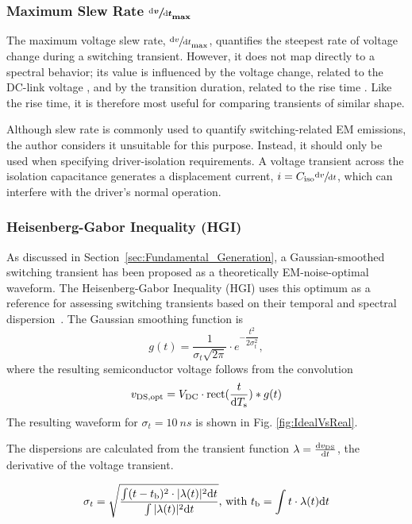 \subsubsection*{Maximum Slew Rate {$\boldmath\sfrac{\textnormal{d}v}{\textnormal{d}t}_\mathrm{max}$}}
The maximum voltage slew rate, $\sfrac{\textnormal{d}v}{\textnormal{d}t}_\mathrm{max}$, quantifies the steepest rate of voltage change during a switching transient. 
However, it does not map directly to a spectral behavior; its value is influenced by the voltage change, related to the DC-link voltage , and by the transition duration, related to the rise time . 
Like the rise time, it is therefore most useful for comparing transients of similar shape.

Although slew rate is commonly used to quantify switching-related EM emissions, the author considers it unsuitable for this purpose. 
Instead, it should only be used when specifying driver-isolation requirements. 
A voltage transient across the isolation capacitance generates a displacement current, $i = C_\mathrm{iso}\sfrac{\mathrm{d}v}{\mathrm{d}t}$, which can interfere with the driver's normal operation.

\subsubsection*{Heisenberg-Gabor Inequality (HGI)}
As discussed in Section~\ref{sec:Fundamental_Generation}, a Gaussian-smoothed switching transient has been proposed as a theoretically EM-noise-optimal waveform. 
The Heisenberg-Gabor Inequality (HGI) uses this optimum as a reference for assessing switching transients based on their temporal and spectral dispersion~\cite{patin_power_2015,martinez-padron_definition_2022}. 
The Gaussian smoothing function is
\begin{equation}
	g(t) = \frac{1}{\sigma_t \sqrt{2\pi}}\cdot e^{-\dfrac{t^2}{2\sigma_t^2}},
\end{equation}
where the resulting semiconductor voltage follows from the convolution
\begin{equation}
	{v}_{\mathrm{DS,opt}} = {V}_{\mathrm{DC}}\cdot\mathrm{rect}(\frac{t}{\mathrm{d}T_\mathrm{s}}) * g(t)
\end{equation}
The resulting waveform for $\sigma_t = \SI{10}{ns}$ is shown in Fig. \ref{fig:IdealVsReal}.

The dispersions are calculated from the transient function $\lambda = \frac{\text{d}{v}_{\mathrm{DS}}}{\text{d}t}$, the derivative of the voltage transient.

\begin{equation}
	\sigma_t = \sqrt{\frac{\int (t-{t}_{\mathrm{b}})^2 \cdot |\lambda(t)|^2 \text{d}t}{\int |\lambda(t)|^2 \text{d}t}}\text{, with } {t}_{\mathrm{b}} = \int t\cdot\lambda(t) \text{d}t
\end{equation}

